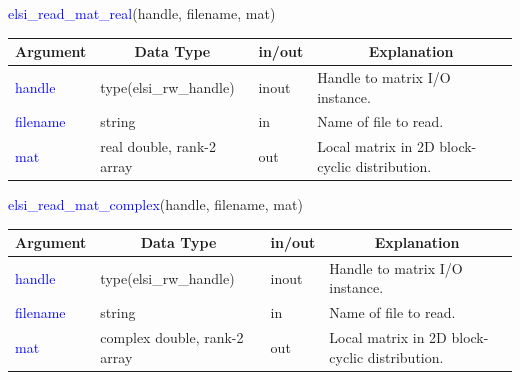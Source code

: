 \documentclass{report}
\begin{document}
\begin{labeling}{\hspace{6cm}}
\item [\hspace{0.3cm} \textcolor{blue}{elsi\_read\_mat\_real}(handle, filename, mat)]
\end{labeling}

\begin{tabular}[]{|p{20mm}|p{45mm}|p{15mm}|p{85mm}|}
\hline
\multicolumn{1}{|c|}{\textbf{Argument}} & \multicolumn{1}{c|}{\textbf{Data Type}} & \multicolumn{1}{c|}{\textbf{in/out}} & \multicolumn{1}{c|}{\textbf{Explanation}}\\
\hline
\textcolor{blue}{handle}   & type(elsi\_rw\_handle)    & inout & Handle to matrix I/O instance.\\
\hline
\textcolor{blue}{filename} & string                    & in    & Name of file to read.\\
\hline
\textcolor{blue}{mat}      & real double, rank-2 array & out   & Local matrix in 2D block-cyclic distribution.\\
\hline
\end{tabular}

\begin{labeling}{\hspace{6cm}}
\item [\hspace{0.3cm} \textcolor{blue}{elsi\_read\_mat\_complex}(handle, filename, mat)]
\end{labeling}

\begin{tabular}[]{|p{20mm}|p{45mm}|p{15mm}|p{85mm}|}
\hline
\multicolumn{1}{|c|}{\textbf{Argument}} & \multicolumn{1}{c|}{\textbf{Data Type}} & \multicolumn{1}{c|}{\textbf{in/out}} & \multicolumn{1}{c|}{\textbf{Explanation}}\\
\hline
\textcolor{blue}{handle}   & type(elsi\_rw\_handle)       & inout & Handle to matrix I/O instance.\\
\hline
\textcolor{blue}{filename} & string                       & in    & Name of file to read.\\
\hline
\textcolor{blue}{mat}      & complex double, rank-2 array & out   & Local matrix in 2D block-cyclic distribution.\\
\hline
\end{tabular}
\end{document}
